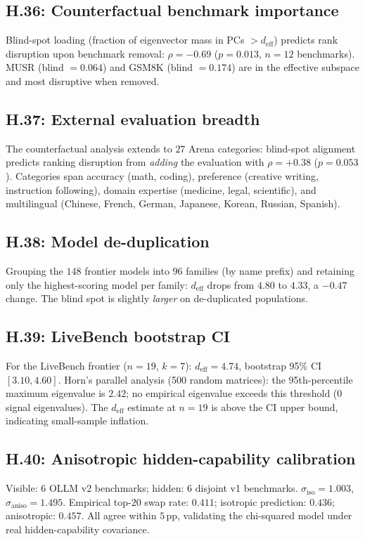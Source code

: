 \documentclass{article}
\begin{document}
\subsection*{H.36: Counterfactual benchmark importance}
Blind-spot loading (fraction of eigenvector mass in PCs $> d_{\mathrm{eff}}$)
predicts rank disruption upon benchmark removal: $\rho = -0.69$
($p = 0.013$, $n = 12$ benchmarks). MUSR (blind $= 0.064$) and
GSM8K (blind $= 0.174$) are in the effective subspace and most
disruptive when removed.

\subsection*{H.37: External evaluation breadth}
The counterfactual analysis extends to $27$ Arena categories:
blind-spot alignment predicts ranking disruption from \emph{adding}
the evaluation with $\rho = +0.38$ ($p = 0.053$). Categories span
accuracy (math, coding), preference (creative writing, instruction
following), domain expertise (medicine, legal, scientific), and
multilingual (Chinese, French, German, Japanese, Korean, Russian,
Spanish).

\subsection*{H.38: Model de-duplication}
Grouping the $148$ frontier models into $96$ families (by name prefix)
and retaining only the highest-scoring model per family:
$d_{\mathrm{eff}}$ drops from $4.80$ to $4.33$, a $-0.47$ change.
The blind spot is slightly \emph{larger} on de-duplicated populations.

\subsection*{H.39: LiveBench bootstrap CI}
For the LiveBench frontier ($n = 19$, $k = 7$):
$d_{\mathrm{eff}} = 4.74$, bootstrap 95\% CI $[3.10, 4.60]$.
Horn's parallel analysis (500 random matrices): the 95th-percentile
maximum eigenvalue is $2.42$; no empirical eigenvalue exceeds this
threshold ($0$ signal eigenvalues). The $d_{\mathrm{eff}}$ estimate
at $n = 19$ is above the CI upper bound, indicating small-sample
inflation.

\subsection*{H.40: Anisotropic hidden-capability calibration}
Visible: $6$ OLLM v2 benchmarks; hidden: $6$ disjoint v1 benchmarks.
$\sigma_{\mathrm{iso}} = 1.003$, $\sigma_{\mathrm{aniso}} = 1.495$.
Empirical top-$20$ swap rate: $0.411$; isotropic prediction: $0.436$;
anisotropic: $0.457$. All agree within $5$\,pp, validating the
chi-squared model under real hidden-capability covariance.
\end{document}
